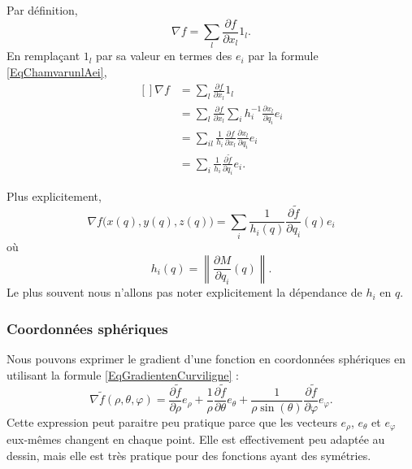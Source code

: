 Par définition,
\begin{equation}
	\nabla f=\sum_l\frac{ \partial f }{ \partial x_l }1_l.
\end{equation}
En remplaçant \( 1_l\) par sa valeur en termes des \( e_i\) par la formule \eqref{EqChamvarunlAei},
\begin{equation}
	\begin{aligned}[]
		\nabla f & =\sum_l\frac{ \partial f }{ \partial x_l }1_l                                                        \\
		         & =\sum_l\frac{ \partial f }{ \partial x_l }\sum_ih_i^{-1}\frac{ \partial x_l }{ \partial q_i }e_i     \\
		         & =\sum_{il}\frac{1}{ h_i }\frac{ \partial f }{ \partial x_l }\frac{ \partial x_l }{ \partial q_i }e_i \\
		         & =\sum_i\frac{1}{ h_i }\frac{ \partial \tilde f }{ \partial q_i }e_i.
	\end{aligned}
\end{equation}

Plus explicitement,
\begin{equation}        \label{EqGradientenCurviligne}
	\nabla f\big( x(q),y(q),z(q) \big)=\sum_i \frac{1}{ h_i(q) }\frac{ \partial \tilde f }{ \partial q_i }(q)e_i
\end{equation}
où
\begin{equation}
	h_i(q)=\left\| \frac{ \partial M }{ \partial q_i }(q) \right\|.
\end{equation}
Le plus souvent nous n'allons pas noter explicitement la dépendance de \( h_i\) en \( q\).

\subsubsection{Coordonnées sphériques}

Nous pouvons exprimer le gradient d'une fonction en coordonnées sphériques en utilisant la formule \eqref{EqGradientenCurviligne} :
\begin{equation}        \label{EqGradientSpherique}
	\nabla\tilde f(\rho,\theta,\varphi)=\frac{ \partial \tilde f }{ \partial \rho }e_{\rho}+\frac{1}{ \rho }\frac{ \partial \tilde f }{ \partial \theta }e_{\theta}+\frac{1}{ \rho\sin(\theta) }\frac{ \partial \tilde f }{ \partial \varphi }e_{\varphi}.
\end{equation}
Cette expression peut paraitre peu pratique parce que les vecteurs \( e_{\rho}\), \( e_{\theta}\) et \( e_{\varphi}\) eux-mêmes changent en chaque point. Elle est effectivement peu adaptée au dessin, mais elle est très pratique pour des fonctions ayant des symétries.

